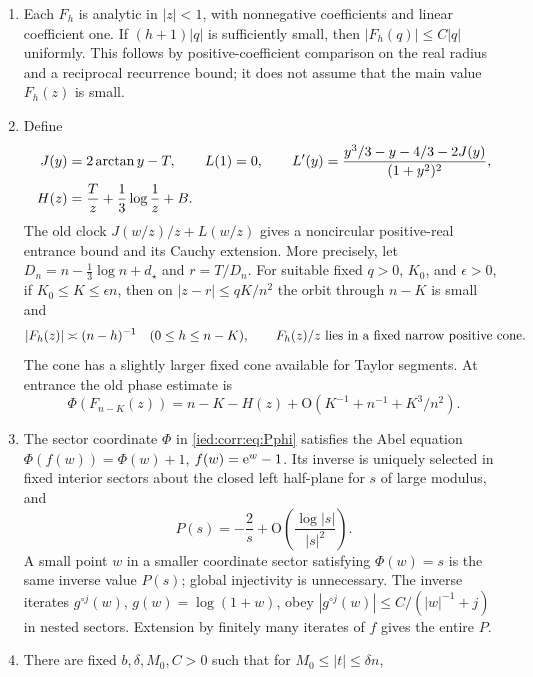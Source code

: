 \documentclass[11pt,letterpaper]{article}
\theoremstyle{remark}\newtheorem{remark}[theorem]{Remark}
\newcommand{\Oh}{\mathrm O}\newcommand{\supp}{\operatorname{supp}}
\begin{document}
\begin{enumerate}[label=\textup{(\roman*)}]
\item Each $F_h$ is analytic in $|z|<1$, with nonnegative coefficients and linear coefficient one. If $(h+1)|q|$ is sufficiently small, then $|F_h(q)|\le C|q|$ uniformly. This follows by positive-coefficient comparison on the real radius and a reciprocal recurrence bound; it does not assume that the main value $F_h(z)$ is small.
\item Define
\begin{align}\label{ied:corr:eq:JLH}
 J(y)&=2\arctan y-T,\qquad L(1)=0,\qquad
 L'(y)=\frac{y^3/3-y-4/3-2J(y)}{(1+y^2)^2},\notag\\
 H(z)&=\frac Tz+\frac13\log\frac1z+B.
\end{align}
The old clock $J(w/z)/z+L(w/z)$ gives a noncircular positive-real entrance bound and its Cauchy extension. More precisely, let $D_n=n-\frac13\log n+d_\star$ and $r=T/D_n$. For suitable fixed $q>0$, $K_0$, and $\epsilon>0$, if $K_0\le K\le\epsilon n$, then on $|z-r|\le qK/n^2$ the orbit through $n-K$ is small and
\begin{equation}\label{ied:corr:eq:entrance}
 |F_h(z)|\asymp(n-h)^{-1}\quad(0\le h\le n-K),
 \qquad F_h(z)/z\ \hbox{lies in a fixed narrow positive cone}.
\end{equation}
The cone has a slightly larger fixed cone available for Taylor segments. At entrance the old phase estimate is
\begin{equation}\label{ied:corr:eq:oldphase}
 \Phi(F_{n-K}(z))=n-K-H(z)
       +\Oh(K^{-1}+n^{-1}+K^3/n^2).
\end{equation}
\item The sector coordinate $\Phi$ in \eqref{ied:corr:eq:Pphi} satisfies the Abel equation $\Phi(f(w))=\Phi(w)+1$, $f(w)=\mathrm e^w-1$. Its inverse is uniquely selected in fixed interior sectors about the closed left half-plane for $s$ of large modulus, and
\begin{equation}\label{ied:corr:eq:Pinv}
 P(s)=-\frac2s+\Oh\left(\frac{\log|s|}{|s|^2}\right).
\end{equation}
A small point $w$ in a smaller coordinate sector satisfying $\Phi(w)=s$ is the same inverse value $P(s)$; global injectivity is unnecessary. The inverse iterates $g^{\circ j}(w)$, $g(w)=\log(1+w)$, obey
$|g^{\circ j}(w)|\le C/(|w|^{-1}+j)$ in nested sectors. Extension by finitely many iterates of $f$ gives the entire $P$.
\item There are fixed $b,\delta,M_0,C>0$ such that for $M_0\le |t|\le\delta n$,

\end{enumerate}
\end{document}
